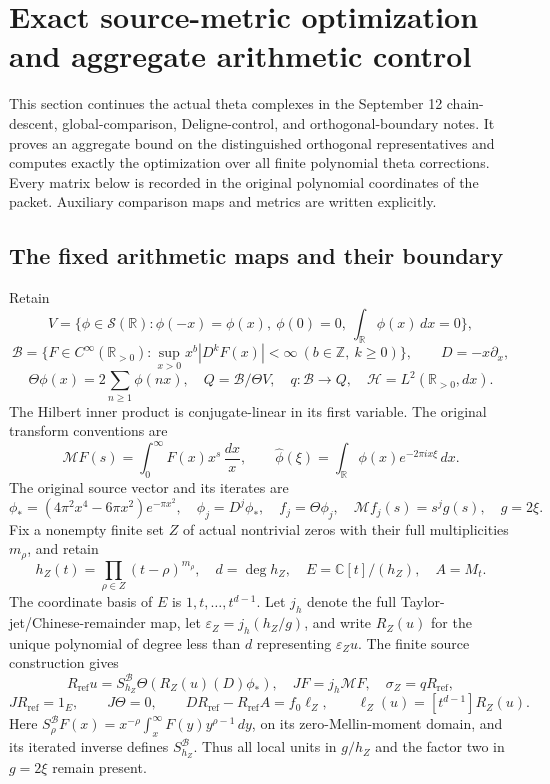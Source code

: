 \section{Exact source-metric optimization and aggregate arithmetic control}
\label{sec:tau-chain-new}

This section continues the actual theta complexes in the September 12
chain-descent, global-comparison, Deligne-control, and orthogonal-boundary
notes.  It proves an aggregate bound on the distinguished orthogonal
representatives and computes exactly the optimization over all finite
polynomial theta corrections.  Every matrix below is recorded in the
original polynomial coordinates of the packet.  Auxiliary comparison maps
and metrics are written explicitly.

\subsection{The fixed arithmetic maps and their boundary}

Retain
\[
 V=\{\phi\in\mathcal S(\mathbb R):\phi(-x)=\phi(x),\
       \phi(0)=0,\ \int_{\mathbb R}\phi(x)\,dx=0\},
\]
\[
 \mathscr B=\{F\in C^\infty(\mathbb R_{>0}):
     \sup_{x>0}x^b|D^kF(x)|<\infty\
     (b\in\mathbb Z,\ k\geq0)\},\qquad D=-x\partial_x,
\]
\[
 \Theta\phi(x)=2\sum_{n\geq1}\phi(nx),\quad
 Q=\mathscr B/\Theta V,\quad q:\mathscr B\longrightarrow Q,\quad
 \mathcal H=L^2(\mathbb R_{>0},dx).
\]
The Hilbert inner product is conjugate-linear in its first variable.
The original transform conventions are
\[
 \mathcal MF(s)=\int_0^\infty F(x)x^s\,\frac{dx}{x},\qquad
 \widehat\phi(\xi)=\int_{\mathbb R}\phi(x)e^{-2\pi i x\xi}\,dx.
\]
The original source vector and its iterates are
\[
 \phi_*=(4\pi^2x^4-6\pi x^2)e^{-\pi x^2},\quad
 \phi_j=D^j\phi_*,\quad f_j=\Theta\phi_j,\quad
 \mathcal M f_j(s)=s^j g(s),\quad g=2\xi.
\]
Fix a nonempty finite set \(Z\) of actual nontrivial zeros with their full
multiplicities \(m_\rho\), and retain
\[
 h_Z(t)=\prod_{\rho\in Z}(t-\rho)^{m_\rho},\quad
 d=\deg h_Z,\quad E=\mathbb C[t]/(h_Z),\quad A=M_t.
\]
The coordinate basis of \(E\) is \(1,t,\ldots,t^{d-1}\).
Let \(j_h\) denote the full Taylor-jet/Chinese-remainder map, let
\(\varepsilon_Z=j_h(h_Z/g)\), and write \(R_Z(u)\) for the unique
polynomial of degree less than \(d\) representing \(\varepsilon_Zu\).
The finite source construction gives
\[
 R_{\mathrm{ref}}u=S_{h_Z}^{\mathscr B}\Theta(R_Z(u)(D)\phi_*),\quad
 JF=j_h\mathcal MF,\quad \sigma_Z=qR_{\mathrm{ref}},
\]
\[
 JR_{\mathrm{ref}}=1_E,\qquad J\Theta=0,\qquad
 DR_{\mathrm{ref}}-R_{\mathrm{ref}}A=f_0\ell_Z,\qquad
 \ell_Z(u)=[t^{d-1}]R_Z(u).
 \tag{TC1}
\]
Here \(S_\rho^{\mathscr B}F(x)=x^{-\rho}\int_x^\infty
F(y)y^{\rho-1}\,dy\), on its zero-Mellin-moment domain, and its iterated
inverse defines \(S_{h_Z}^{\mathscr B}\).  Thus all local units in \(g/h_Z\)
and the factor two in \(g=2\xi\) remain present.

